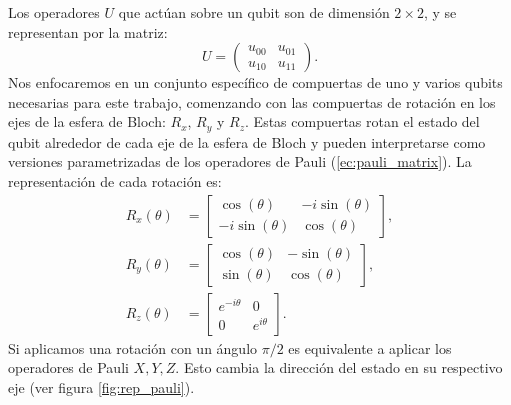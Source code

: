 \documentclass[letterpaper,12pt]{thesisECFM}
\theoremstyle{plain}
\theoremstyle{definition}
\theoremstyle{definition}
\theoremstyle{remark}
\newcommand{\1}{\mathbb{1}}
\begin{document}
Los operadores $U$ que actúan sobre un qubit son de dimensión $2 \times 2$, y se representan por la matriz:
\begin{equation}
    U = \begin{pmatrix}
    u_{00} & u_{01}  \\
    u_{10} & u_{11} 
    \end{pmatrix}.
\end{equation}
Nos enfocaremos en un conjunto específico de compuertas de uno y varios qubits
necesarias para este trabajo, comenzando con las compuertas de rotación en los
ejes de la esfera de Bloch: $R_x$, $R_y$ y $R_z$. Estas compuertas rotan el
estado del qubit alrededor de cada eje de la esfera de Bloch y pueden
interpretarse como versiones parametrizadas de los operadores de Pauli (\ref{ec:pauli_matrix}). La representación de cada rotación es:
\begin{align}
    R_x(\theta) &=  \begin{bmatrix}
    \cos{(\theta)} & -i\sin{(\theta)}\\
    -i\sin{(\theta)} & \cos{(\theta)} 
    \end{bmatrix},  \\
    R_y(\theta) &=  \begin{bmatrix}
    \cos{(\theta)} & -\sin{(\theta)}\\
    \sin{(\theta)} & \cos{(\theta)} 
    \end{bmatrix}, \\
    R_z(\theta) &=  \begin{bmatrix}
    e^{-i\theta} & 0\\
    0 & e^{i\theta} 
    \end{bmatrix}.
\end{align}
Si aplicamos una rotación con un ángulo $\pi/2$ es equivalente a aplicar los
operadores de Pauli $X, Y, Z$. Esto cambia la dirección del estado en su
respectivo eje (ver figura \ref{fig:rep_pauli}). 
\end{document}
